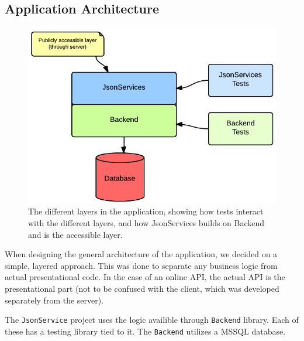 \subsection{Application Architecture}

\begin{figure}[hbt]
	\centering
	\includegraphics[scale=0.5]{./p1design/layers.png}
	\caption{The different layers in the application, showing how tests interact with
        the different layers, and how JsonServices builds on Backend and is the accessible
        layer.}
	\label{fig:layers}
\end{figure}

When designing the general architecture of the application, we decided on a simple, layered approach.
This was done to separate any business logic from actual presentational code. In the case of an online
API, the actual API is the presentational part (not to be confused with the client, which was developed
separately from the server).

The \verb+JsonService+ project uses the logic availible through \verb+Backend+ library. Each of these has
a testing library tied to it. The \verb+Backend+ utilizes a MSSQL database.